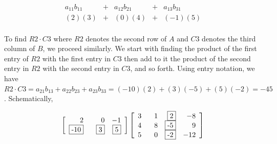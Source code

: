 \documentclass{ximera}
\begin{document}
\[\begin{array}{ccccc}
 a_{11}b_{11} & + & a_{12}b_{21} & + & a_{13}b_{31}  \\

  (2)(3) & + &(0)(4)& + & (-1)(5)  \\

\end{array}\]



To find $R2 \cdot C3$ where $R2$ denotes the second row of $A$ and $C3$ denotes the third column of $B$, we proceed similarly. We start with finding the product of the first entry of $R2$ with the first entry in $C3$ then add to it the product of the second entry in $R2$ with the second entry in $C3$, and so forth.  Using entry notation, we have $R2 \cdot C3 = a_{21}b_{13} + a_{22}b_{23} + a_{23}b_{33} = (-10)(2) + (3)(-5) + (5)(-2) = -45$.  Schematically, 

\[ \left[\begin{array}{rrr} 2 & 0 & -1 \\ \fbox{-10} & \hphantom{-}\fbox{3} & \fbox{5} \\ \end{array} \right] \left[\begin{array}{rrrr}  3 & \hphantom{-}1 & \fbox{2} & -8 \\ 4 & 8 & \fbox{-5} & 9  \\ 5 & 0 & \fbox{-2} & -12 \\  \end{array} \right] \]
\end{document}
